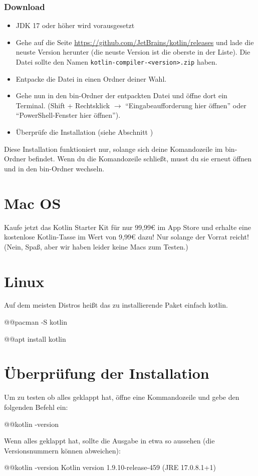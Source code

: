 \subsubsection*{Download}
\begin{itemize}
    \item JDK 17 oder höher wird vorausgesetzt
    \item Gehe auf die Seite \url{https://github.com/JetBrains/kotlin/releases} und lade die neuste Version herunter (die neuste Version ist die oberste in der Liste). Die Datei sollte den Namen \texttt{kotlin-compiler-<version>.zip} haben.
    \item Entpacke die Datei in einen Ordner deiner Wahl.
    \item Gehe nun in den bin-Ordner der entpackten Datei und öffne dort ein Terminal. (Shift + Rechtsklick $\rightarrow$ \enquote{Eingabeaufforderung hier öffnen} oder \enquote{PowerShell-Fenster hier öffnen}).
    \item Überprüfe die Installation (siehe Abschnitt )
\end{itemize}
\begin{hinweis}
    Diese Installation funktioniert nur, solange sich deine Komandozeile im bin-Ordner befindet. Wenn du die Komandozeile schließt, musst du sie erneut öffnen und in den bin-Ordner wechseln.
\end{hinweis}
\section*{Mac OS}
Kaufe jetzt das Kotlin Starter Kit für nur 99,99€ im App Store und erhalte eine kostenlose Kotlin-Tasse im Wert von 9,99€ dazu! Nur solange der Vorrat reicht! (Nein, Spaß, aber wir haben leider keine Macs zum Testen.)

\section*{Linux}
Auf dem meisten Distros heißt das zu installierende Paket einfach {\ttfamily kotlin}.
\begin{commandshell}[][]
    @\shellprefix{}@pacman -S kotlin
\end{commandshell}

\begin{commandshell}[][]
    @\shellprefix{}@apt install kotlin
\end{commandshell}

\section*{Überprüfung der Installation}\label{sec:check}
Um zu testen ob alles geklappt hat, öffne eine Kommandozeile und gebe den folgenden Befehl ein:
\begin{commandshell}
    @\shellprefix{}@kotlin -version
\end{commandshell}

Wenn alles geklappt hat, sollte die Ausgabe in etwa so aussehen (die Versionsnummern können abweichen):
\begin{commandshell}[][]
    @\shellprefix{}@kotlin -version
    Kotlin version 1.9.10-release-459 (JRE 17.0.8.1+1)
\end{commandshell}


